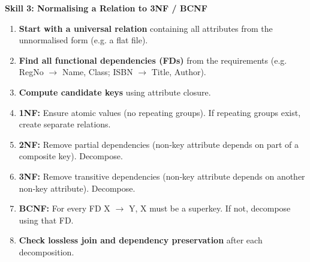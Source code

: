 \documentclass[11pt]{article}
\begin{document}
\textbf{Skill 3: Normalising a Relation to 3NF / BCNF}\par
\begin{methode}
\begin{enumerate}
\item \textbf{Start with a universal relation} containing all attributes from the unnormalised form (e.g. a flat file).
\item \textbf{Find all functional dependencies (FDs)} from the requirements (e.g. RegNo $\rightarrow$ Name, Class; ISBN $\rightarrow$ Title, Author).
\item \textbf{Compute candidate keys} using attribute closure.
\item \textbf{1NF:} Ensure atomic values (no repeating groups). If repeating groups exist, create separate relations.
\item \textbf{2NF:} Remove partial dependencies (non‑key attribute depends on part of a composite key). Decompose.
\item \textbf{3NF:} Remove transitive dependencies (non‑key attribute depends on another non‑key attribute). Decompose.
\item \textbf{BCNF:} For every FD X $\rightarrow$ Y, X must be a superkey. If not, decompose using that FD.
\item \textbf{Check lossless join and dependency preservation} after each decomposition.
\end{enumerate}
\end{methode}
\end{document}
